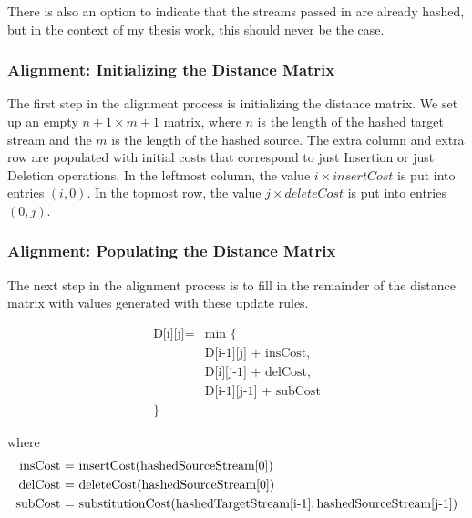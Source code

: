 There is also an option to indicate that the streams passed in are already hashed, but in the context of my thesis work, this should never be the case. 

\subsubsection{Alignment: Initializing the Distance Matrix}
The first step in the alignment process is initializing the distance matrix. We set up an empty $n+1 \times m+1$ matrix, where $n$ is the length of the hashed target stream and the $m$ is the length of the hashed source. The extra column and extra row are populated with initial costs that correspond to just Insertion or just Deletion operations. In the leftmost column, the value $i \times insertCost$ is put into entries $(i, 0)$. In the topmost row, the value $j \times deleteCost$ is put into entries $(0, j)$. 

\subsubsection{Alignment: Populating the Distance Matrix}
The next step in the alignment process is to fill in the remainder of the distance matrix with values generated with these update rules. 

\begin{equation*}
\begin{split}
\text{D[i][j]} = &  \text{min \{ }\\
& \text{D[i-1][j] + insCost,} \\
& \text{D[i][j-1] + delCost,} \\
& \text{D[i-1][j-1] + subCost} \\
\text{\}}
\end{split}
\end{equation*}


where 
\begin{align*}
	\text{insCost = }  {}& \text{insertCost(hashedSourceStream[0])} \\
	\text{delCost = } {}& \text{deleteCost(hashedSourceStream[0])} \\ 
	\text{subCost = } {}& \text{substitutionCost(}  \text{hashedTargetStream[i-1]},  \-
	\text{hashedSourceStream[j-1])} \\						
\end{align*}

